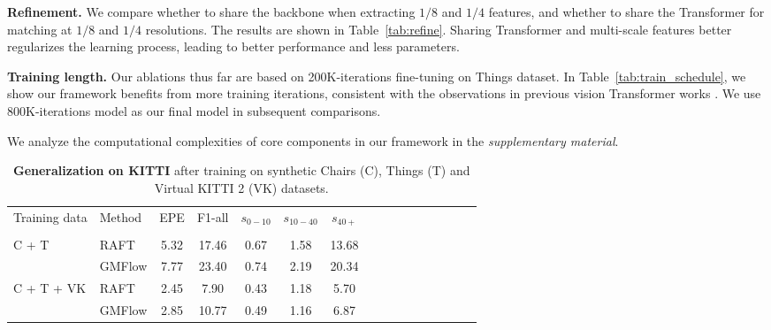 \documentclass[10pt,twocolumn,letterpaper]{article}
\begin{document}
{\bf Refinement.} We compare whether to share the backbone when extracting $1/8$ and $1/4$ features, and whether to share the Transformer for matching at $1/8$ and $1/4$ resolutions. The results are shown in Table~\ref{tab:refine}. Sharing Transformer and multi-scale features better regularizes the learning process, leading to better performance and less parameters.


{\bf Training length.} Our ablations thus far are based on 200K-iterations fine-tuning on Things dataset. In Table~\ref{tab:train_schedule}, we show our framework benefits from more training iterations, consistent with the observations in previous vision Transformer works \cite{dosovitskiy2020image,liu2021Swin}. We use 800K-iterations model as our final model in subsequent comparisons.


We analyze the computational complexities of core components in our framework in the \emph{supplementary material}. 







\begin{table}[t]
    \centering
    \setlength{\tabcolsep}{1.5pt} \begin{tabular}{llcccccccccccccc}
    \toprule
    
    Training data & Method & EPE & F1-all & $s_{0-10}$ & $s_{10-40}$ & $s_{40+}$ &   \\

    \addlinespace[-12pt] \\
    
    \midrule
    
    \multirow{2}{*}[-2pt]{C + T} & RAFT & 5.32 & 17.46 & 0.67 & 1.58 & 13.68 \\
    & GMFlow & 7.77 & 23.40 & 0.74 & 2.19 & 20.34 \\
    
    \midrule
    
    \multirow{2}{*}[-2pt]{C + T + VK} & RAFT & 2.45 & 7.90 & 0.43 & 1.18 & 5.70 \\
    & GMFlow & 2.85 & 10.77 & 0.49 & 1.16 & 6.87 \\


    \bottomrule
    \end{tabular}
    \vspace{-8pt}
    \caption{\textbf{Generalization on KITTI} after training on synthetic Chairs (C), Things (T) and Virtual KITTI 2 (VK) datasets. 
    }
    \label{tab:gen_kitti}
    \vspace{-16pt}
    
    
\end{table}
\end{document}
